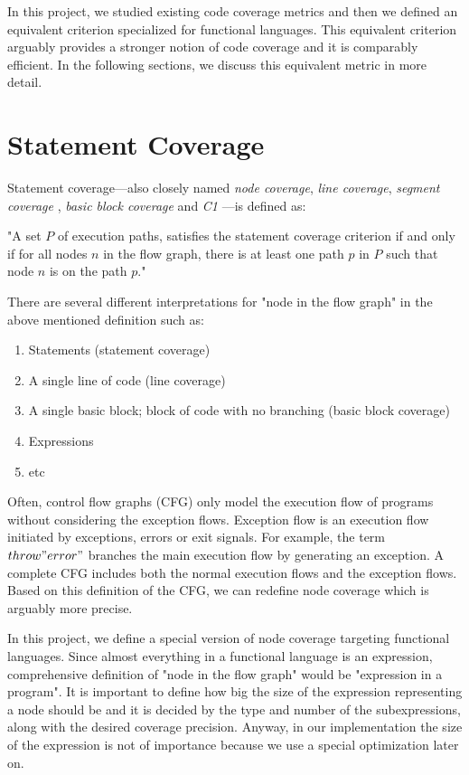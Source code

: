\documentclass[12pt,a4paper]{report}
\begin{document}
In this project, we studied existing code coverage metrics and then we defined an equivalent criterion specialized for functional languages. This equivalent criterion arguably provides a stronger notion of code coverage and it is comparably efficient. In the following sections, we discuss this equivalent metric in more detail.

\section{Statement Coverage}
Statement coverage---also closely named \emph{node coverage}, \emph{line coverage}, \emph{segment coverage} \cite{Ntafos:1988:CST:630792.631017}, \emph{basic block coverage} and \emph{C1} \cite{beizer2002software}---is defined as: 

"A set $P$ of execution paths, satisfies the statement coverage criterion if and only if for all nodes $n$ in the flow graph, there is at least one path $p$ in $P$ such that node $n$ is on the path $p$."\cite{Zhu:1997:SUT:267580.267590}

There are several different interpretations for "node in the flow graph" in the above mentioned definition such as:

\begin{enumerate}
 \item Statements (statement coverage)
 \item A single line of code (line coverage)
 \item A single basic block; block of code with no branching (basic block coverage)
 \item Expressions 
 \item etc
\end{enumerate}

Often, control flow graphs (CFG) only model the execution flow of programs without considering the exception flows. Exception flow is an execution flow initiated by exceptions, errors or exit signals. For example, the term $throw "error"$  branches the main execution flow by generating an exception. A complete CFG includes both the normal execution flows and the exception flows. Based on this definition of the CFG, we can redefine node coverage which is arguably more precise.

In this project, we define a special version of node coverage targeting functional languages. Since almost everything in a functional language is an expression, comprehensive definition of "node in the flow graph" would be "expression in a program". It is important to define how big the size of the expression representing a node should be and it is decided by the type and number of the subexpressions, along with the desired coverage precision. Anyway, in our implementation the size of the expression is not of importance because we use a special optimization later on.   
\end{document}

